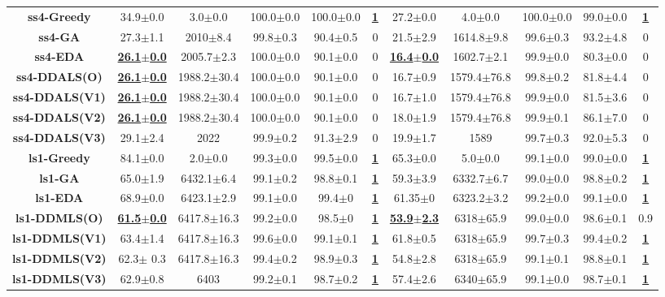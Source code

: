 \documentclass[lettersize,journal]{IEEEtran}
\begin{document}
\begin{table}[!t]
{\begin{tabular}{ccccccccccc}
        \midrule
        {\bfseries ss4-Greedy} &34.9$\pm$0.0 &3.0$\pm$0.0 & 100.0$\pm$0.0&100.0$\pm$0.0 &\underline{\bfseries 1} &27.2$\pm$0.0&4.0$\pm$0.0& 100.0$\pm$0.0&99.0$\pm$0.0  &\underline{\bfseries 1} \\
        {\bfseries ss4-GA} &27.3$\pm$1.1&2010$\pm$8.4 & 99.8$\pm$0.3&90.4$\pm$0.5&0&21.5$\pm$2.9&1614.8$\pm$9.8& 99.6$\pm$0.3&93.2$\pm$4.8  &0 \\
        {\bfseries ss4-EDA} &\underline{\bfseries 26.1$\pm$0.0} &2005.7$\pm$2.3 & 100.0$\pm$0.0&90.1$\pm$0.0&0 &\underline{\bfseries 16.4$\pm$0.0} &1602.7$\pm$2.1& 99.9$\pm$0.0&80.3$\pm$0.0  &0 \\
        {\bfseries ss4-DDALS(O)} &\underline{\bfseries 26.1$\pm$0.0} &1988.2$\pm$30.4 & 100.0$\pm$0.0&90.1$\pm$0.0&0&16.7$\pm$0.9&1579.4$\pm$76.8 & 99.8$\pm$0.2&81.8$\pm$4.4&0 \\
        {\bfseries ss4-DDALS(V1)} &\underline{\bfseries 26.1$\pm$0.0} &1988.2$\pm$30.4 & 100.0$\pm$0.0&90.1$\pm$0.0&0&16.7$\pm$1.0&1579.4$\pm$76.8& 99.9$\pm$0.0&81.5$\pm$3.6  &0 \\
        {\bfseries ss4-DDALS(V2)} &\underline{\bfseries 26.1$\pm$0.0} &1988.2$\pm$30.4 & 100.0$\pm$0.0&90.1$\pm$0.0&0&18.0$\pm$1.9&1579.4$\pm$76.8& 99.9$\pm$0.1&86.1$\pm$7.0  &0 \\
        {\bfseries ss4-DDALS(V3)} &29.1$\pm$2.4&2022 & 99.9$\pm$0.2&91.3$\pm$2.9&0&19.9$\pm$1.7&1589& 99.7$\pm$0.3&92.0$\pm$5.3  &0 \\
        
        \midrule
        {\bfseries ls1-Greedy} &84.1$\pm$0.0 &2.0$\pm$0.0 & 99.3$\pm$0.0 &99.5$\pm$0.0 &\underline{\bfseries 1} &65.3$\pm$0.0 &5.0$\pm$0.0 &99.1$\pm$0.0& 99.0$\pm$0.0 &\underline{\bfseries 1} \\
        {\bfseries ls1-GA} &65.0$\pm$1.9 &6432.1$\pm$6.4 & 99.1$\pm$0.2 &98.8$\pm$0.1 &\underline{\bfseries 1} &59.3$\pm$3.9 &6332.7$\pm$6.7& 99.0$\pm$0.0 &98.8$\pm$0.2 &\underline{\bfseries 1} \\
        {\bfseries ls1-EDA} &68.9$\pm$0.0 &6423.1$\pm$2.9 & 99.1$\pm$0.0 &99.4$\pm$0 &\underline{\bfseries 1} &61.35$\pm$0 &6323.2$\pm$3.2& 99.2$\pm$0.0 &99.1$\pm$0.0 &\underline{\bfseries 1} \\
        {\bfseries ls1-DDMLS(O)} &\underline{\bfseries61.5$\pm$0.0} &6417.8$\pm$16.3 & 99.2$\pm$0.0 &98.5$\pm$0 &\underline{\bfseries 1} &\underline{\bfseries53.9$\pm$2.3} &6318$\pm$65.9& 99.0$\pm$0.0 &98.6$\pm$0.1 &0.9 \\
        {\bfseries ls1-DDMLS(V1)} &63.4$\pm$1.4 &6417.8$\pm$16.3 & 99.6$\pm$0.0 &99.1$\pm$0.1 &\underline{\bfseries 1} &61.8$\pm$0.5 &6318$\pm$65.9& 99.7$\pm$0.3 &99.4$\pm$0.2 &\underline{\bfseries 1} \\
        {\bfseries ls1-DDMLS(V2)} &62.3$\pm$ 0.3 &6417.8$\pm$16.3 & 99.4$\pm$0.2 &98.9$\pm$0.3 &\underline{\bfseries 1} &54.8$\pm$2.8 &6318$\pm$65.9& 99.1$\pm$0.1 &98.8$\pm$0.1 &\underline{\bfseries 1} \\
        {\bfseries ls1-DDMLS(V3)} &62.9$\pm$0.8 &6403 & 99.2$\pm$0.1 &98.7$\pm$0.2 &\underline{\bfseries 1} &57.4$\pm$2.6 &6340$\pm$65.9& 99.1$\pm$0.0 &98.7$\pm$0.1 &\underline{\bfseries 1} \\
        

\end{tabular}}
\end{table}
\end{document}

